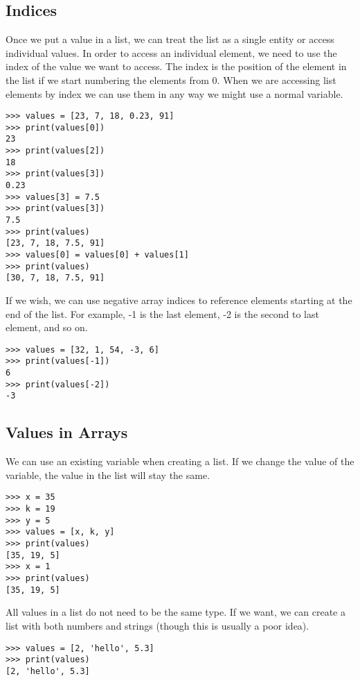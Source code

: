 \documentclass[11pt]{cselabheader}
\begin{document}
\subsection{Indices}
Once we put a value in a list, we can treat the list as a single entity or access individual values. In order to access an individual element, we need to use the index of the value we want to access. The index is the position of the element in the list if we start numbering the elements from 0. When we are accessing list elements by index we can use them in any way we might use a normal variable.

\begin{lstlisting}[style=ipython]
>>> values = [23, 7, 18, 0.23, 91]
>>> print(values[0])
23
>>> print(values[2])
18
>>> print(values[3])
0.23
>>> values[3] = 7.5
>>> print(values[3])
7.5
>>> print(values)
[23, 7, 18, 7.5, 91]
>>> values[0] = values[0] + values[1]
>>> print(values)
[30, 7, 18, 7.5, 91]
\end{lstlisting}

If we wish, we can use negative array indices to reference elements starting at the end of the list. For example, -1 is the last element, -2 is the second to last element, and so on.

\begin{lstlisting}[style=ipython]
>>> values = [32, 1, 54, -3, 6]
>>> print(values[-1])
6
>>> print(values[-2])
-3
\end{lstlisting}

\subsection{Values in Arrays}
We can use an existing variable when creating a list. If we change the value of the variable, the value in the list will stay the same.

\begin{lstlisting}[style=ipython]
>>> x = 35
>>> k = 19
>>> y = 5
>>> values = [x, k, y]
>>> print(values)
[35, 19, 5]
>>> x = 1
>>> print(values)
[35, 19, 5]
\end{lstlisting}

All values in a list do not need to be the same type. If we want, we can create a list with both numbers and strings (though this is usually a poor idea).

\begin{lstlisting}[style=ipython]
>>> values = [2, 'hello', 5.3]
>>> print(values)
[2, 'hello', 5.3]
\end{lstlisting}
\end{document}
